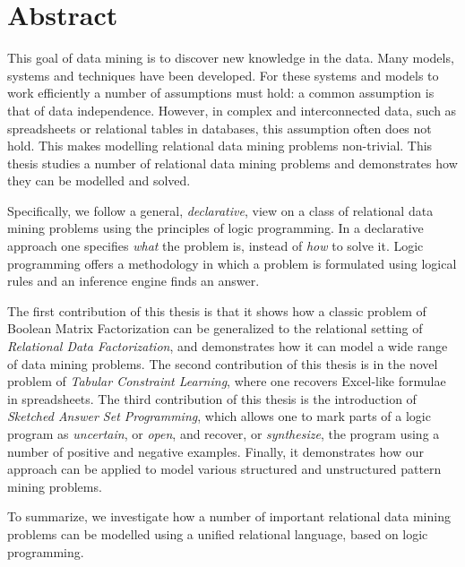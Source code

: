 \chapter{Abstract} \label{ch:abstract}
This goal of data mining is to discover new knowledge in the data. Many models, systems and techniques have been developed. For these systems and models to work efficiently a number of assumptions must hold: a common assumption is that of  data independence. However, in complex and interconnected data, such as spreadsheets or relational tables in databases, this assumption often does not hold. This makes modelling relational data mining problems non-trivial. This thesis studies a number of relational data mining problems and demonstrates how they can be modelled and solved.

Specifically, we follow a general, \textit{declarative}, view on a
class of relational data mining problems using the principles of logic
programming. In a declarative approach one specifies \textit{what} the
problem is, instead of \textit{how} to solve it. Logic programming offers a methodology in which a problem is formulated using logical rules and an inference engine finds an answer. 

The first contribution of this thesis is that it shows how a classic
problem of Boolean Matrix Factorization can be generalized to the
relational setting of \textit{Relational Data Factorization}, and 
demonstrates how it can model a wide range of data mining problems. The
second contribution of this thesis is in the novel
problem of \textit{Tabular Constraint Learning}, where one recovers
Excel-like formulae in spreadsheets. The third contribution of this
thesis is the introduction of \textit{Sketched Answer Set
Programming}, which allows one to mark parts of a logic program as
\textit{uncertain}, or \textit{open}, and recover, or
\textit{synthesize}, the program using a number of positive and
negative examples. Finally, it demonstrates how our approach can be
applied to model various structured and unstructured pattern mining
problems.

To summarize, we investigate how a number of important relational data
mining problems can be modelled using a unified relational language, based on logic programming. 

\cleardoublepage

